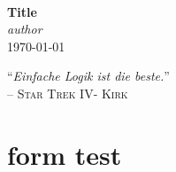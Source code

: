 \documentclass[ngerman,a4paper,10pt]{scrartcl}
\newcommand{\DocTitle}      {Title}
\newcommand{\DocAuthor}     {author }
\newcommand{\DocDate}       {\today}
\begin{document}
{
    \centering
    ~\\[4cm]
    {\Huge \textbf{ \color{darkblue} \DocTitle } } \\[1cm]
     \color{lightgray} \textit{\DocAuthor} \\ \DocDate \\[1cm]

    {\small
    \begin{flushright}
        "`\textit{Einfache Logik ist die beste.}"'  \\
        -- \textsc{Star Trek IV- Kirk}
    \end{flushright}
    }
}
\section{form test}
\begin{Form}[action={....}]
    \\[3em]
     ~~~~~~~~\\[3em]
    \\[3em]
\end{Form}
\end{document}
